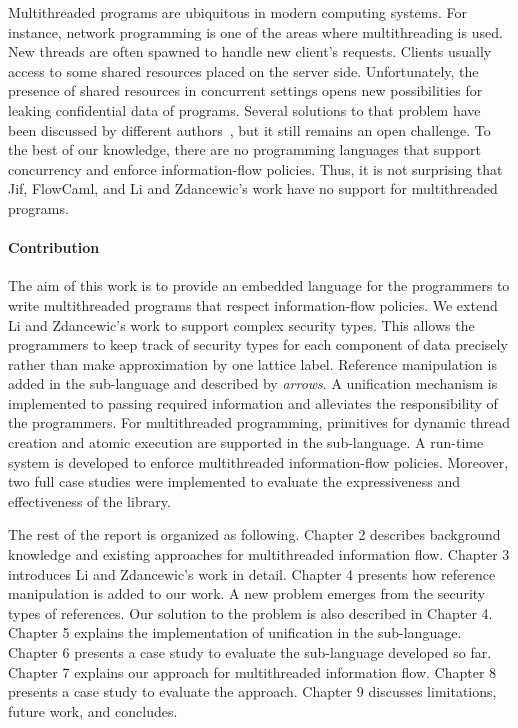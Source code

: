 \documentclass{report}
\begin{document}
Multithreaded programs are ubiquitous in modern computing systems. 
For instance, network programming 
is one of the areas where multithreading is used.
New threads are often spawned to handle new client's requests. 
Clients usually access to some shared resources placed on the server side. 
Unfortunately, the presence of shared resources in concurrent settings 
opens new possibilities for leaking confidential data of programs.  
Several solutions to that problem have been discussed by different 
authors~\cite{Castellani:Boudol:TCS02,Russo:Sabelfeld:CSFW06,Sabelfeld:Sands:CSFW00,Volpano:Smith:Probabilistic}, 
but it still remains an open challenge. 
To the best of our knowledge, there are no programming languages that 
support concurrency and enforce information-flow policies. Thus, 
it is not surprising that Jif, FlowCaml,
and Li and Zdancewic's work have no support for multithreaded programs.

\paragraph{Contribution}
The aim of this work is to provide an embedded language for the programmers
to write multithreaded programs that respect information-flow policies. 
We extend Li and Zdancewic's work to support complex security types. 
This allows the programmers to keep track of security types for each component
of data precisely rather than make approximation by one lattice label.
Reference manipulation is added in the sub-language and described by
{\em arrows}. A unification mechanism is implemented to passing
required information and alleviates the responsibility of the programmers.
For multithreaded programming, primitives for dynamic thread 
creation and atomic execution are supported in the sub-language.
A run-time system is developed to enforce multithreaded information-flow policies.
Moreover, two full case studies were implemented to
evaluate the expressiveness and effectiveness of the library.

The rest of the report is organized as following. Chapter 2 describes background
knowledge and existing approaches for multithreaded
information flow. Chapter 3 introduces Li and Zdancewic's work in detail. 
Chapter 4 presents how reference manipulation is added to our work. A new
problem emerges from the security types of references. Our solution to the
problem is also described in Chapter 4. Chapter 5 explains the 
implementation of unification in the sub-language. Chapter 6 presents a case study
to evaluate the sub-language developed so far. Chapter 7 explains
our approach for multithreaded information flow. Chapter 8 presents
a case study to evaluate the approach. Chapter 9 discusses limitations,
future work, and concludes.
\end{document}

